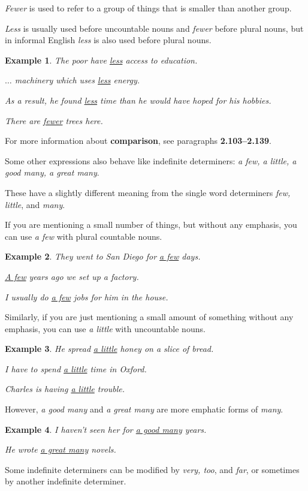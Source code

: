 \documentclass[oneside]{book}
\numberwithin{equation}{section}
\newtheorem{example}{Example}[section]
\begin{document}
\textit{Fewer} is used to refer to a group of things that is smaller than another group.

\textit{Less} is usually used before uncountable nouns and \textit{fewer} before plural nouns, but in informal English \textit{less} is also used before plural nouns.
\begin{example}
    The poor have \underline{less} access to education.
    
    $\ldots$ machinery which uses \underline{less} energy.
    
    As a result, he found \underline{less} time than he would have hoped for his hobbies.
    
    There are \underline{fewer} trees here.
\end{example}
For more information about \textbf{comparison}, see paragraphs \textbf{2.103--2.139}.

%
\noindent{} Some other expressions also behave like indefinite determiners: \textit{a few, a little, a good many, a great many}.

These have a slightly different meaning from the single word determiners \textit{few, little}, and \textit{many}.

%
If you are mentioning a small number of things, but without any emphasis, you can use \textit{a few} with plural countable nouns.
\begin{example}
    They went to San Diego for \underline{a few} days.
    
    \underline{A few} years ago we set up a factory.
    
    I usually do \underline{a few} jobs for him in the house.
\end{example}
Similarly, if you are just mentioning a small amount of something without any emphasis, you can use \textit{a little} with uncountable nouns.
\begin{example}
    He spread \underline{a little} honey on a slice of bread.
    
    I have to spend \underline{a little} time in Oxford.
    
    Charles is having \underline{a little} trouble.
\end{example}
However, \textit{a good many} and \textit{a great many} are more emphatic forms of \textit{many}.
\begin{example}
    I haven't seen her for \underline{a good many} years.
    
    He wrote \underline{a great many} novels.
\end{example}
%
\noindent{} Some indefinite determiners can be modified by \textit{very, too}, and \textit{far}, or sometimes by another indefinite determiner.
\end{document}
